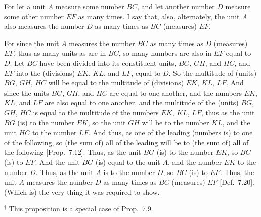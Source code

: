 \begin{Parallel}{}{}
{\epsfysize=0.65in
\centerline{}

For let a unit $A$ measure some number $BC$, and let another number $D$ measure some
other number $EF$ as many times. I  say that, also, alternately,
the unit $A$ also measures the number $D$ as many times
as $BC$ (measures) $EF$.

For since the unit $A$ measures the number $BC$ as many times as 
$D$ (measures) $EF$, thus as many units as are in $BC$, so many 
numbers are also in  $EF$ equal to $D$. Let $BC$ have been divided into its
constituent units, $BG$, $GH$, and $HC$, and $EF$ into the (divisions) $EK$, $KL$, and $LF$, equal
to $D$. So the multitude of (units) $BG$, $GH$, $HC$ will be equal to the multitude
of (divisions) $EK$, $KL$, $LF$. And since the units $BG$, $GH$, and $HC$ are equal to
one another, and the numbers $EK$, $KL$,  and $LF$ are also equal to one another, and the multitude of the (units) $BG$, $GH$, $HC$ is
equal to the multitude of the numbers $EK$, $KL$, $LF$,
thus as the unit $BG$ (is) to the number $EK$, so the unit $GH$ will be to the number $KL$, and
the unit $HC$ to the number $LF$. And thus, as one of the leading (numbers is) to
one of the following, so (the sum of) all of the leading will be to (the sum of) all of the following 
[Prop.~7.12]. Thus, as the unit $BG$ (is) to the number $EK$,
so $BC$ (is) to $EF$. And the unit $BG$ (is) equal to the unit $A$, and the number
$EK$ to the number $D$. Thus, as the unit $A$ is to the number $D$, so $BC$ (is) to
$EF$. Thus, the unit $A$ measures the number $D$ as many times as $BC$ (measures)
$EF$ [Def.~7.20]. (Which is) the very thing it was required to show.}
\end{Parallel}
{\footnotesize\noindent$^\dag$ This proposition is a
special case of Prop.~7.9.}~\\


